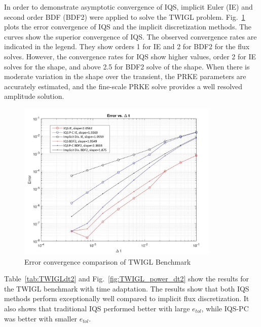 \documentclass{elsarticle}
\newcommand{\fig}[1]{Fig.~\ref{#1}}                      %
\newcommand{\tbl}[1]{Table~\ref{#1}}                     %
\newcommand{\iqspc}{IQS-PC\xspace}
\begin{document}

In order to demonstrate asymptotic convergence of IQS, implicit Euler (IE) and second order BDF (BDF2) were applied to solve the TWIGL problem. \fig{fig:TWIGL_conv} plots the error convergence of IQS and the implicit discretization methods.  The curves show the superior convergence of IQS. The observed convergence rates are indicated in the legend. They show orders 1 for IE and 2 for BDF2 for the flux solves. However, the convergence rates for IQS show higher values, order 2 for IE solves for the shape, and above 2.5 for BDF2 solve of the shape. When there is moderate variation in the shape over the transient, the PRKE parameters are accurately estimated, and the fine-scale PRKE solve provides a well resolved amplitude solution.

\begin{figure}[!htbp]
\centering
\includegraphics[height=3in]{figures/TWIGL_convergence.jpg}
\caption{Error convergence comparison of TWIGL Benchmark}
\label{fig:TWIGL_conv}
\end{figure}


\tbl{tab:TWIGLdt2} and \fig{fig:TWIGL_power_dt2} show the results for the TWIGL benchmark with time adaptation.  The results show that both IQS methods perform exceptionally well compared to implicit flux discretization.  It also shows that traditional IQS performed better with large $e_{tol}$, while \iqspc was better with smaller $e_{tol}$.
\end{document}
